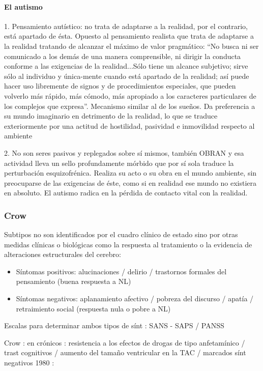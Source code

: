 \paragraph{El autismo}

1. Pensamiento autístico: no trata de adaptarse a la realidad, por el contrario, está apartado de ésta. Opuesto al pensamiento realista que trata de adaptarse a la realidad tratando de alcanzar el máximo de valor pragmático: ``No busca ni ser comunicado a los demás de una manera comprensible, ni dirigir la conducta conforme a las exigencias de la realidad...Sólo tiene un alcance subjetivo; sirve sólo al individuo y única-mente cuando está apartado de la realidad; así puede hacer uso libremente de signos y de procedimientos especiales, que pueden volverlo más rápido, más cómodo, más apropiado a los caracteres particulares de los complejos que expresa''.  Mecanismo similar al de los sueños. Da preferencia a su mundo imaginario en detrimento de la realidad, lo que se traduce exteriormente por una actitud de hostilidad, pasividad e inmovilidad respecto al ambiente

2. No son seres pasivos y replegados sobre sí mismos, también OBRAN y esa actividad lleva un sello profundamente mórbido que por sí sola traduce la perturbación esquizofrénica. Realiza su acto o su obra en el mundo ambiente, sin preocuparse de las exigencias de éste, como si en realidad ese mundo no existiera en absoluto. El autismo radica en la pérdida de contacto vital con la realidad.

\subsubsection*{Crow}

Subtipos no son identificados por el cuadro clínico de estado sino por otras medidas clínicas o biológicas como la respuesta al tratamiento o la evidencia de alteraciones estructurales del cerebro:
\begin{itemize}
	\item Síntomas positivos: alucinaciones / delirio / trastornos formales del pensamiento (buena respuesta a NL)
	\item Síntomas negativos: aplanamiento afectivo / pobreza del discurso / apatía / retraimiento social (respuesta nula o pobre a NL)
\end{itemize}
Escalas para determinar ambos tipos de sínt : SANS - SAPS / PANSS

Crow : en crónicos : resistencia a los efectos de drogas de tipo anfetamínico / trast cognitivos / aumento del tamaño ventricular en la TAC / marcados sínt negativos 1980 : 

